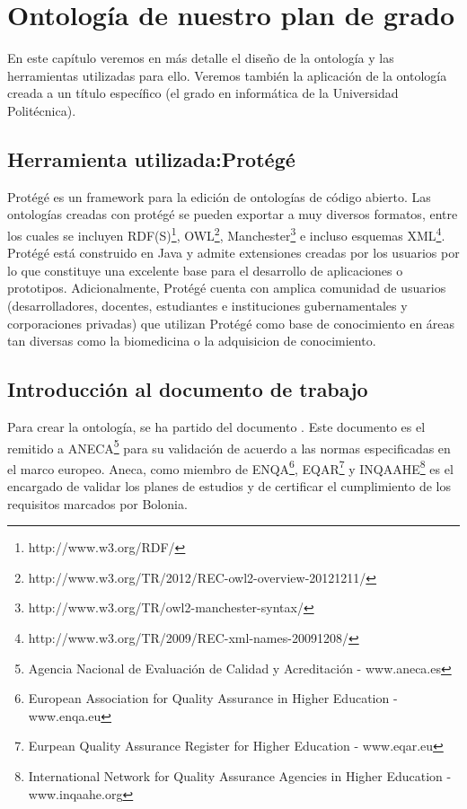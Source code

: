 \chapter{Ontología de nuestro plan de grado}

En este capítulo veremos en más detalle el diseño de la ontología y las herramientas utilizadas para ello. Veremos también la aplicación de la ontología creada a un título específico (el grado en informática de la Universidad Politécnica).

\section{Herramienta utilizada:Protégé}
Protégé\cite{Stanford-Protege:WEB} es un framework para la edición de ontologías de código abierto. Las ontologías creadas con protégé se pueden exportar a muy diversos formatos, entre los cuales se incluyen RDF(S)\footnote{http://www.w3.org/RDF/}, OWL\footnote{http://www.w3.org/TR/2012/REC-owl2-overview-20121211/}, Manchester\footnote{http://www.w3.org/TR/owl2-manchester-syntax/} e incluso esquemas XML\footnote{http://www.w3.org/TR/2009/REC-xml-names-20091208/}.
Protégé está construido en Java y admite extensiones creadas por los usuarios por lo que constituye una excelente base para el desarrollo de aplicaciones o prototipos.
Adicionalmente, Protégé cuenta con amplica comunidad de usuarios (desarrolladores, docentes, estudiantes e instituciones gubernamentales y corporaciones privadas) que utilizan Protégé como base de conocimiento en áreas tan diversas como la biomedicina o la adquisicion de conocimiento.

\section{Introducción al documento de trabajo}
Para crear la ontología, se ha partido del documento \cite{FIUPM-MemoAneca}. Este documento es el remitido a ANECA\footnote{Agencia Nacional de Evaluación de Calidad y Acreditación - www.aneca.es} para su validación de acuerdo a las normas especificadas en el marco europeo. Aneca, como miembro de ENQA\footnote{European Association for Quality Assurance in Higher Education - www.enqa.eu}, EQAR\footnote{Eurpean Quality Assurance Register for Higher Education - www.eqar.eu} y INQAAHE\footnote{International Network for Quality Assurance Agencies in Higher Education - www.inqaahe.org} es el encargado de validar los planes de estudios y de certificar el cumplimiento de los requisitos marcados por Bolonia.

